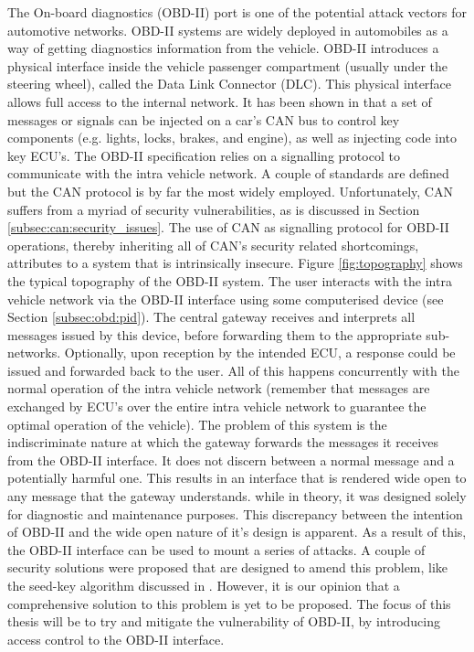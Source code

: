 The On-board diagnostics (OBD-II) port is one of the potential attack vectors for automotive networks. OBD-II systems are widely deployed in automobiles as a way of getting diagnostics information from the vehicle. OBD-II introduces a physical interface inside the vehicle passenger compartment (usually under the steering wheel), called the Data Link Connector (DLC). This physical interface allows full access to the internal network. It has been shown in \cite{MillerA,Yadav16,MillerB,MillerC} that a set of messages or signals can be injected on a car's CAN bus to control key components (e.g. lights, locks, brakes, and engine), as well as injecting code into key ECU's. The OBD-II specification relies on a signalling protocol to communicate with the intra vehicle network. A couple of standards are defined but the CAN protocol is by far the most widely employed. Unfortunately, CAN suffers from a myriad of security vulnerabilities, as is discussed in Section \ref{subsec:can:security_issues}. The use of CAN as signalling protocol for OBD-II operations, thereby inheriting all of CAN's security related shortcomings, attributes to a system that is intrinsically insecure. Figure \ref{fig:topography} shows the typical topography of the OBD-II system. The user interacts with the intra vehicle network via the OBD-II interface using some computerised device (see Section \ref{subsec:obd:pid}). The central gateway receives and interprets all messages issued by this device, before forwarding them to the appropriate sub-networks. Optionally, upon reception by the intended ECU, a response could be issued and forwarded back to the user. All of this happens concurrently with the normal operation of the intra vehicle network (remember that messages are exchanged by ECU's over the entire intra vehicle network to guarantee the optimal operation of the vehicle). The problem of this system is the indiscriminate nature at which the gateway forwards the messages it receives from the OBD-II interface. It does not discern between a normal message and a potentially harmful one. This results in an interface that is rendered wide open to any message that the gateway understands. while in theory, it was designed solely for diagnostic and maintenance purposes. This discrepancy between the intention of OBD-II and the wide open nature of it's design is apparent. As a result of this, the OBD-II interface can be used to mount a series of attacks. A couple of security solutions were proposed that are designed to amend this problem, like the seed-key algorithm discussed in \cite{Yadav16}. However, it is our opinion that a comprehensive solution to this problem is yet to be proposed. The focus of this thesis will be to try and mitigate the vulnerability of OBD-II, by introducing access control to the OBD-II interface. 

